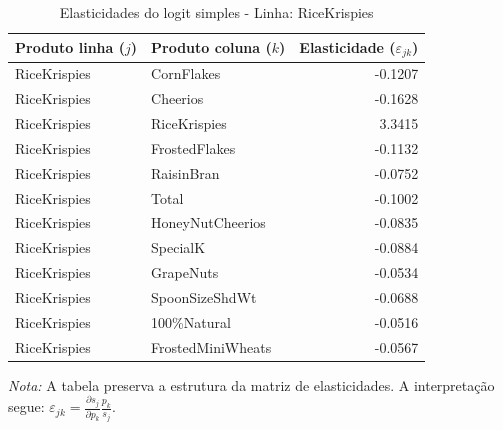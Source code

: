 \begingroup
\begin{table}[H]
\centering
\caption{Elasticidades do logit simples - Linha: RiceKrispies}
\label{tab:elas-ricekrispies}
\small
\begin{tabular}{llr}
\toprule
Produto linha ($j$) & Produto coluna ($k$) & Elasticidade ($\varepsilon_{jk}$) \\
\midrule
RiceKrispies & CornFlakes & -0.1207 \\
RiceKrispies & Cheerios & -0.1628 \\
RiceKrispies & RiceKrispies & 3.3415 \\
RiceKrispies & FrostedFlakes & -0.1132 \\
RiceKrispies & RaisinBran & -0.0752 \\
RiceKrispies & Total & -0.1002 \\
RiceKrispies & HoneyNutCheerios & -0.0835 \\
RiceKrispies & SpecialK & -0.0884 \\
RiceKrispies & GrapeNuts & -0.0534 \\
RiceKrispies & SpoonSizeShdWt & -0.0688 \\
RiceKrispies & 100\%Natural & -0.0516 \\
RiceKrispies & FrostedMiniWheats & -0.0567 \\
\bottomrule
\end{tabular}

\vspace{0.3em}
\footnotesize
\textit{Nota:} A tabela preserva a estrutura da matriz de elasticidades. A interpretação segue: $\varepsilon_{jk}=\frac{\partial s_j}{\partial p_k}\frac{p_k}{s_j}$.
\end{table}
\endgroup


